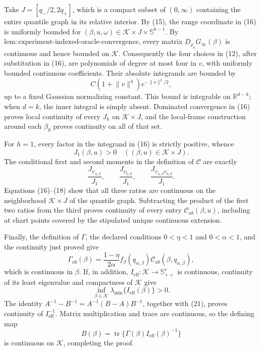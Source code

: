Take
\(J=[q_-/2,2q_+]\), which is a compact subset of \((0,\infty)\) containing the entire quantile graph in its relative interior.  By (15), the range coordinate in (16) is uniformly bounded for \((\beta,u,\omega)\in\mathcal K\times J\times\mathbb S^{k-1}\).  By \(\mathrm{lem{:}experiment\text{-}indexed\text{-}oracle\text{-}convergence}\), every matrix \(D_{\rho_a}G_\infty(\beta)\) is continuous and hence bounded on \(\mathcal K\).  Consequently the four choices in (12), after substitution in (16), are polynomials of degree at most four in \(v\), with uniformly bounded continuous coefficients.  Their absolute integrands are bounded by
\[
C(1+\lVert v\rVert^4)e^{-\lVert v\rVert^2/2},
\tag{17}
\]
up to a fixed Gaussian normalizing constant.  This bound is integrable on \(\mathbb R^{d-k}\); when \(d=k\), the inner integral is simply absent.  Dominated convergence in (16) proves local continuity of every \(J_h\) on \(\mathcal K\times J\), and the local-frame construction around each \(\beta_0\) proves continuity on all of that set.

For \(h=1\), every factor in the integrand in (16) is strictly positive, whence
\[
J_1(\beta,u)>0
\quad((\beta,u)\in\mathcal K\times J).
\tag{18}
\]
The conditional first and second moments in the definition of \(\mathcal C\) are exactly
\[
\frac{J_{\psi_{a,\beta}}}{J_1},\qquad
\frac{J_{\psi_{b,\beta}}}{J_1},\qquad
\frac{J_{\psi_{a,\beta}\psi_{b,\beta}}}{J_1}.
\tag{19}
\]
Equations (16)--(18) show that all three ratios are continuous on the neighborhood \(\mathcal K\times J\) of the quantile graph.  Subtracting the product of the first two ratios from the third proves continuity of every entry \(\mathcal C_{ab}(\beta,u)\), including at chart points covered by the stipulated unique continuous extension.

Finally, the definition of \(\Gamma\), the declared conditions \(0<\eta<1\) and \(0<\alpha<1\), and the continuity just proved give
\[
\Gamma_{ab}(\beta)
=\frac{1-\eta}{2\alpha}
f_\beta(q_{\alpha,\beta})
\mathcal C_{ab}(\beta,q_{\alpha,\beta}),
\tag{20}
\]
which is continuous in \(\beta\).  If, in addition, \(I_{\mathrm{eff}}:\mathcal K\to\mathbb S_{++}^{r}\) is continuous, continuity of its least eigenvalue and compactness of \(\mathcal K\) give
\[
\inf_{\beta\in\mathcal K}\lambda_{\min}\{I_{\mathrm{eff}}(\beta)\}>0.
\tag{21}
\]
The identity \(A^{-1}-B^{-1}=A^{-1}(B-A)B^{-1}\), together with (21), proves continuity of \(I_{\mathrm{eff}}^{-1}\).  Matrix multiplication and trace are continuous, so the defining map
\[
B(\beta)=\operatorname{tr}\{\Gamma(\beta)I_{\mathrm{eff}}(\beta)^{-1}\}
\tag{22}
\]
is continuous on \(\mathcal K\), completing the proof.
